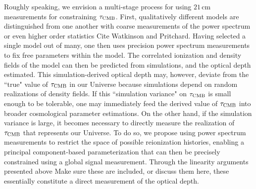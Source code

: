 \documentclass[twocolumn,aps,prd,nofootinbib,showpacs]{revtex4-1}
\begin{document}
Roughly speaking, we envision a multi-stage process for using $21\,\textrm{cm}$ measurements for constraining $\tau_\textrm{CMB}$. First, qualitatively different models are distinguished from one another with coarse measurements of the power spectrum or even higher order statistics \acl{Cite Watkinson and Pritchard}. Having selected a single model out of many, one then uses precision power spectrum measurements to fix free parameters within the model. The correlated ionization and density fields of the model can then be predicted from simulations, and the optical depth estimated. This simulation-derived optical depth may, however, deviate from the ``true" value of $\tau_\textrm{CMB}$ in our Universe because simulations depend on random realizations of density fields. If this ``simulation variance" on $\tau_\textrm{CMB}$ is small enough to be tolerable, one may immediately feed the derived value of $\tau_\textrm{CMB}$ into broader cosmological parameter estimations. On the other hand, if the simulation variance is large, it becomes necessary to directly measure the realization of $\tau_\textrm{CMB}$ that represents our Universe. To do so, we propose using power spectrum measurements to restrict the space of possible reionization histories, enabling a principal component-based parameterization that can then be precisely constrained using a global signal measurement. Through the linearity arguments presented above \acl{Make sure these are included, or discuss them here}, these essentially constitute a direct measurement of the optical depth.
\end{document}
